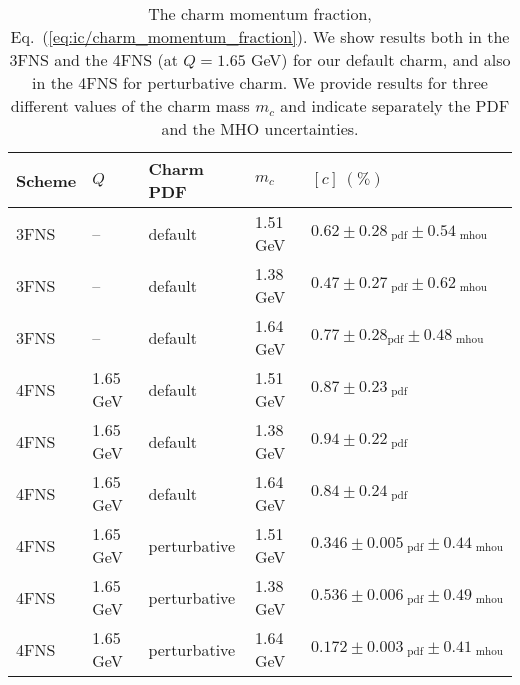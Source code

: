 \begin{table}[t]
  \footnotesize
  \centering
    \renewcommand{\arraystretch}{1.30}
\begin{tabularx}{\textwidth}{C{2.0cm}C{2.3cm}C{2.2cm}C{2.2cm}C{5.6cm}}
  \toprule
  Scheme  & $Q$ & Charm PDF & $m_c$  &  $\left[ c\right]~\left(\%\right)$ \\
  \midrule
  \midrule
 3FNS  & --  &default  &  1.51 GeV  &   $ 0.62\pm0.28_\textrm{ pdf}\pm 0.54_\textrm{ mhou} $ \\
 3FNS  & --  &default  &  1.38 GeV  &   $ 0.47\pm0.27_\textrm{ pdf}\pm 0.62_\textrm{ mhou} $ \\
 3FNS  & --  &default  &  1.64 GeV  &    $ 0.77\pm0.28_\textrm{
  pdf}\pm 0.48_\textrm{ mhou} $ \\
  \midrule

 4FNS  & 1.65 GeV  & default  &  1.51 GeV  &   $0.87 \pm 0.23_\textrm{ pdf}$  \\
 4FNS  & 1.65 GeV  & default &  1.38 GeV  &   $0.94 \pm 0.22_\textrm{ pdf}$  \\
 4FNS  & 1.65 GeV  & default   &  1.64 GeV  &  $0.84 \pm 0.24_\textrm{ pdf}$  \\
  \midrule
 \midrule
 4FNS  & 1.65 GeV   & perturbative  &  1.51 GeV  &   $0.346\pm 0.005_\textrm{ pdf}\pm 0.44_\textrm{ mhou}$ \\
 4FNS  & 1.65 GeV   & perturbative  &  1.38 GeV  &    $0.536\pm 0.006_\textrm{ pdf}\pm 0.49_\textrm{ mhou}$ \\
 4FNS  & 1.65 GeV   & perturbative  &  1.64 GeV  &    $0.172\pm 0.003_\textrm{ pdf}\pm 0.41_\textrm{ mhou}$ \\
\bottomrule
\end{tabularx}
\vspace{0.3cm}
\caption{\label{tab:ic/momfrac_lowQ}
  The charm momentum fraction, Eq.~(\ref{eq:ic/charm_momentum_fraction}).
  We show  results both in the 3FNS and the 4FNS (at $Q=1.65$ GeV)
  for our default charm, and also in the 4FNS for perturbative charm.
We provide results for  three different values of the charm mass $m_c$ and
indicate separately the PDF and the MHO uncertainties.
}
\end{table}

